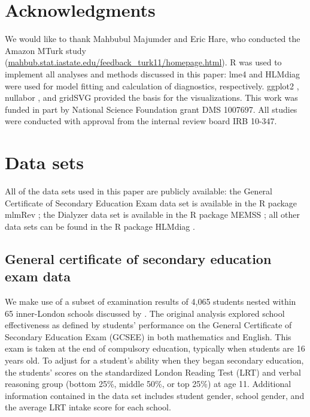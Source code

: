 \documentclass[12pt]{article} %
\newcommand{\hh}[1]{{\color{orange} #1}}
\newcommand{\alnote}[1]{\todo[inline,color=green!40]{#1}} %
\begin{document}

\section{Acknowledgments}
We would like to thank Mahbubul Majumder and Eric Hare, who conducted the Amazon MTurk study (\url{mahbub.stat.iastate.edu/feedback_turk11/homepage.html}). R \citep{R} was used to implement all analyses and methods discussed in this paper: lme4 \citep{lme4} and HLMdiag \citep{HLMDiag} were used for model fitting and  calculation of diagnostics, respectively.  ggplot2 \citep{ggplot2}, nullabor \citep{nullabor}, and gridSVG \citep{gridSVG} provided the basis for the visualizations.
This work was funded in part by National Science Foundation grant DMS 1007697. All studies were conducted with approval from the internal review board IRB 10-347.

\appendix
\section{Data sets}

All of the data sets used in this paper are publicly available: the General Certificate of Secondary Education Exam data set is available in the R package mlmRev \citep{mlmRev}; the Dialyzer data set is available in the R package MEMSS \citep{MEMSS}; all other data sets can be found in the R package HLMdiag \citep{HLMDiag}.

\subsection{General certificate of secondary education exam data}\label{data:GCSE}

We make use of a subset of examination results of 4,065 students nested within 65 inner-London schools discussed by \cite{Goldstein:1993wm}. The original analysis explored school effectiveness as defined by students' performance on the General Certificate of Secondary Education Exam (GCSEE) in both mathematics and English. This exam is taken at the end of compulsory education, typically when students are 16 years old.  To adjust for a student's ability when they began secondary education, the students' scores on the standardized London Reading Test (LRT) and verbal reasoning group (bottom 25\%, middle 50\%, or top 25\%) at age 11. Additional information contained in the data set includes student gender, school gender, and the average LRT intake score for each school. 
\end{document}
